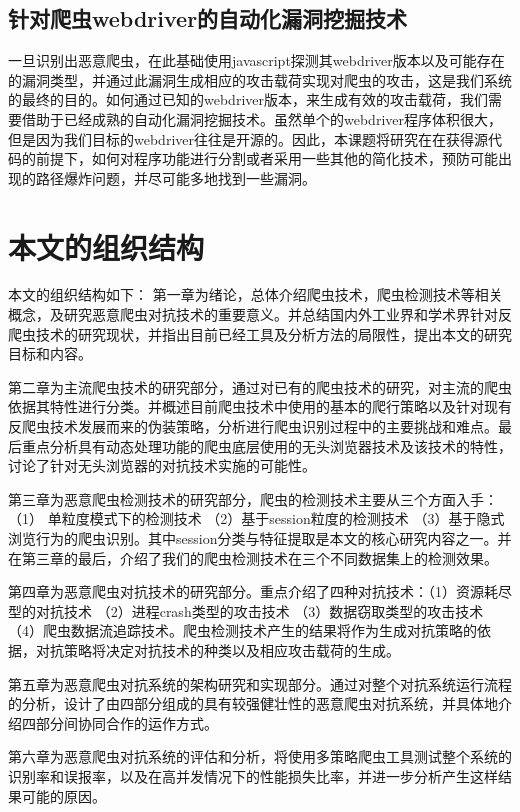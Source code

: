 \documentclass[doctor,privacy,twoside]{buaa_mac}
\begin{document}
\subsection{针对爬虫webdriver的自动化漏洞挖掘技术}
一旦识别出恶意爬虫，在此基础使用javascript探测其webdriver版本以及可能存在的漏洞类型，并通过此漏洞生成相应的攻击载荷实现对爬虫的攻击，这是我们系统的最终的目的。如何通过已知的webdriver版本，来生成有效的攻击载荷，我们需要借助于已经成熟的自动化漏洞挖掘技术。虽然单个的webdriver程序体积很大，但是因为我们目标的webdriver往往是开源的。因此，本课题将研究在在获得源代码的前提下，如何对程序功能进行分割或者采用一些其他的简化技术，预防可能出现的路径爆炸问题，并尽可能多地找到一些漏洞。


\section{本文的组织结构}
本文的组织结构如下：
第一章为绪论，总体介绍爬虫技术，爬虫检测技术等相关概念，及研究恶意爬虫对抗技术的重要意义。并总结国内外工业界和学术界针对反爬虫技术的研究现状，并指出目前已经工具及分析方法的局限性，提出本文的研究目标和内容。


第二章为主流爬虫技术的研究部分，通过对已有的爬虫技术的研究，对主流的爬虫依据其特性进行分类。并概述目前爬虫技术中使用的基本的爬行策略以及针对现有反爬虫技术发展而来的伪装策略，分析进行爬虫识别过程中的主要挑战和难点。最后重点分析具有动态处理功能的爬虫底层使用的无头浏览器技术及该技术的特性，讨论了针对无头浏览器的对抗技术实施的可能性。

第三章为恶意爬虫检测技术的研究部分，爬虫的检测技术主要从三个方面入手：（1） 单粒度模式下的检测技术 （2）基于session粒度的检测技术  （3）基于隐式浏览行为的爬虫识别。其中session分类与特征提取是本文的核心研究内容之一。并在第三章的最后，介绍了我们的爬虫检测技术在三个不同数据集上的检测效果。

第四章为恶意爬虫对抗技术的研究部分。重点介绍了四种对抗技术：（1）资源耗尽型的对抗技术 （2）进程crash类型的攻击技术 （3）数据窃取类型的攻击技术 （4）爬虫数据流追踪技术。爬虫检测技术产生的结果将作为生成对抗策略的依据，对抗策略将决定对抗技术的种类以及相应攻击载荷的生成。

第五章为恶意爬虫对抗系统的架构研究和实现部分。通过对整个对抗系统运行流程的分析，设计了由四部分组成的具有较强健壮性的恶意爬虫对抗系统，并具体地介绍四部分间协同合作的运作方式。

第六章为恶意爬虫对抗系统的评估和分析，将使用多策略爬虫工具测试整个系统的识别率和误报率，以及在高并发情况下的性能损失比率，并进一步分析产生这样结果可能的原因。
\end{document}
